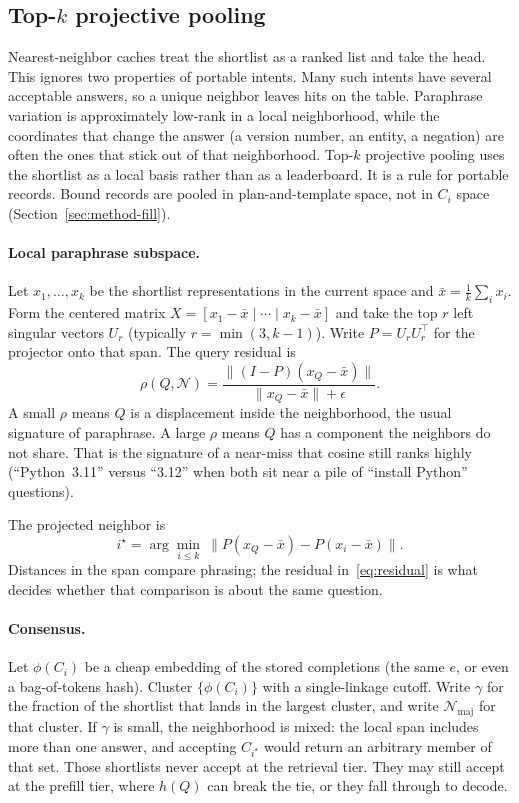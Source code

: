 \subsection{Top-$k$ projective pooling}
\label{sec:method-pool}

Nearest-neighbor caches treat the shortlist as a ranked list and take the head. This ignores two properties of portable intents. Many such intents have several acceptable answers, so a unique neighbor leaves hits on the table. Paraphrase variation is approximately low-rank in a local neighborhood, while the coordinates that change the answer (a version number, an entity, a negation) are often the ones that stick out of that neighborhood. Top-$k$ projective pooling uses the shortlist as a local basis rather than as a leaderboard. It is a rule for portable records. Bound records are pooled in plan-and-template space, not in $C_i$ space (Section~\ref{sec:method-fill}).

\paragraph{Local paraphrase subspace.}
Let $x_1,\ldots,x_k$ be the shortlist representations in the current space and $\bar x=\frac{1}{k}\sum_i x_i$. Form the centered matrix $X=[x_1-\bar x\mid\cdots\mid x_k-\bar x]$ and take the top $r$ left singular vectors $U_r$ (typically $r=\min(3,k-1)$). Write $P=U_rU_r^\top$ for the projector onto that span. The query residual is
\begin{equation}
\label{eq:residual}
\rho(Q,\mathcal{N})
  = \frac{\bigl\|(I-P)(x_Q-\bar x)\bigr\|}{\|x_Q-\bar x\|+\epsilon}.
\end{equation}
A small $\rho$ means $Q$ is a displacement inside the neighborhood, the usual signature of paraphrase. A large $\rho$ means $Q$ has a component the neighbors do not share. That is the signature of a near-miss that cosine still ranks highly (``Python~3.11'' versus ``3.12'' when both sit near a pile of ``install Python'' questions).

The projected neighbor is
\begin{equation}
\label{eq:proj-nn}
i^\star
  = \arg\min_{i\le k}\ \bigl\|P(x_Q-\bar x)-P(x_i-\bar x)\bigr\|.
\end{equation}
Distances in the span compare phrasing; the residual in~\eqref{eq:residual} is what decides whether that comparison is about the same question.

\paragraph{Consensus.}
Let $\phi(C_i)$ be a cheap embedding of the stored completions (the same $e$, or even a bag-of-tokens hash). Cluster $\{\phi(C_i)\}$ with a single-linkage cutoff. Write $\gamma$ for the fraction of the shortlist that lands in the largest cluster, and write $\mathcal{N}_{\mathrm{maj}}$ for that cluster. If $\gamma$ is small, the neighborhood is mixed: the local span includes more than one answer, and accepting $C_{i^\star}$ would return an arbitrary member of that set. Those shortlists never accept at the retrieval tier. They may still accept at the prefill tier, where $h(Q)$ can break the tie, or they fall through to decode.

